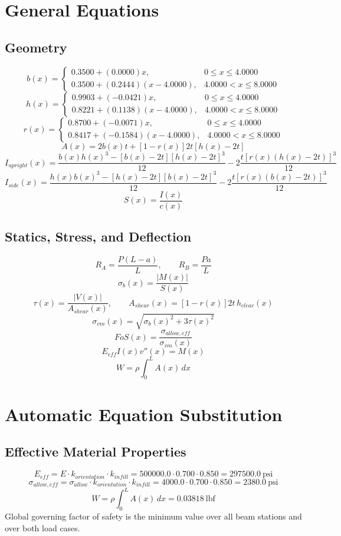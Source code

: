 \documentclass[11pt]{article}
\begin{document}
\section*{General Equations}
\subsection*{Geometry}
\[
b(x)=\begin{cases}0.3500 + (0.0000)x, & 0 \le x \le 4.0000\\0.3500 + (0.2444)(x-4.0000), & 4.0000 < x \le 8.0000\end{cases}
\]
\[
h(x)=\begin{cases}0.9903 + (-0.0421)x, & 0 \le x \le 4.0000\\0.8221 + (0.1138)(x-4.0000), & 4.0000 < x \le 8.0000\end{cases}
\]
\[
r(x)=\begin{cases}0.8700 + (-0.0071)x, & 0 \le x \le 4.0000\\0.8417 + (-0.1584)(x-4.0000), & 4.0000 < x \le 8.0000\end{cases}
\]
\[
A(x)=2b(x)t+[1-r(x)]2t[h(x)-2t]
\]
\[
I_{upright}(x)=\frac{b(x)h(x)^3-[b(x)-2t][h(x)-2t]^3}{12}-2\frac{t[r(x)(h(x)-2t)]^3}{12}
\]
\[
I_{side}(x)=\frac{h(x)b(x)^3-[h(x)-2t][b(x)-2t]^3}{12}-2\frac{t[r(x)(b(x)-2t)]^3}{12}
\]
\[
S(x)=\frac{I(x)}{c(x)}
\]

\subsection*{Statics, Stress, and Deflection}
\[
R_A=\frac{P(L-a)}{L}, \qquad R_B=\frac{Pa}{L}
\]
\[
\sigma_b(x)=\frac{|M(x)|}{S(x)}
\]
\[
\tau(x)=\frac{|V(x)|}{A_{shear}(x)}, \qquad A_{shear}(x)=[1-r(x)]2t\,h_{clear}(x)
\]
\[
\sigma_{vm}(x)=\sqrt{\sigma_b(x)^2+3\tau(x)^2}
\]
\[
FoS(x)=\frac{\sigma_{allow,eff}}{\sigma_{vm}(x)}
\]
\[
E_{eff}I(x)v''(x)=M(x)
\]
\[
W=\rho\int_0^L A(x)\,dx
\]

\section*{Automatic Equation Substitution}
\subsection*{Effective Material Properties}
\[E_{eff} = E \cdot k_{orientation} \cdot k_{infill} = 500000.0 \cdot 0.700 \cdot 0.850 = 297500.0\ \mathrm{psi}\]
\[\sigma_{allow,eff} = \sigma_{allow} \cdot k_{orientation} \cdot k_{infill} = 4000.0 \cdot 0.700 \cdot 0.850 = 2380.0\ \mathrm{psi}\]
\[W = \rho \int_0^L A(x)\,dx = 0.03818\ \mathrm{lbf}\]
Global governing factor of safety is the minimum value over all beam stations and over both load cases.
\end{document}
